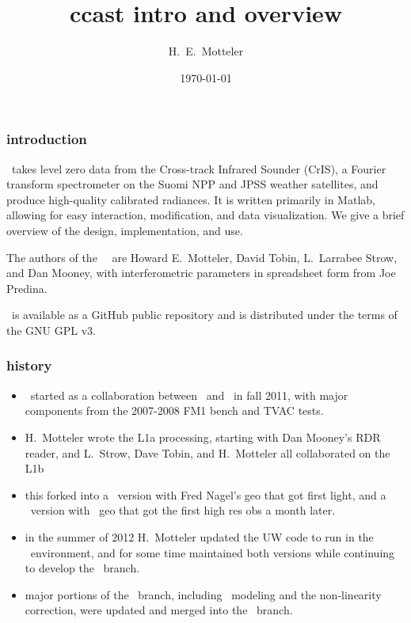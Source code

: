 \documentclass[11pt]{beamer}
\title{ccast intro and overview}
\author{H.~E.~Motteler}
\institute{
  UMBC Atmospheric Spectroscopy Lab \\
  Joint Center for Earth Systems Technology \\
}
\date{\today}
\begin{document}
\begin{frame}[plain]
\titlepage
\end{frame}
\begin{frame}
\frametitle{introduction}

\ccast\ takes level zero data from the Cross-track Infrared Sounder
(CrIS), a Fourier transform spectrometer on the Suomi NPP and JPSS
weather satellites, and produce high-quality calibrated radiances.
It is written primarily in Matlab, allowing for easy interaction,
modification, and data visualization.  We give a brief overview of
the design, implementation, and use.

\hspace{2cm}

The authors of the \umbc\ \ccast\ are Howard E.~Motteler, David Tobin,
L.~Larrabee Strow, and Dan Mooney, with interferometric parameters
in spreadsheet form from Joe Predina.

\hspace{2cm}

\ccast\ is available as a GitHub public repository and is distributed
under the terms of the GNU GPL v3.

\end{frame}
\begin{frame}
\frametitle{history}

\begin{itemize}
  \item \ccast\ started as a collaboration between \umbc\ and
    \uw\ in fall 2011, with major components from the 2007-2008 FM1
    bench and TVAC tests.

  \item H.~Motteler wrote the L1a processing, starting with Dan
    Mooney's RDR reader, and L.~Strow, Dave Tobin, and H.~Motteler
    all collaborated on the L1b 

  \item this forked into a \uw\ version with Fred Nagel's geo that
    got first light, and a \umbc\ version with \noaa\ geo that got
    the first high res obs a month later.

  \item in the summer of 2012 H.~Motteler updated the UW code to 
    run in the \umbc\ environment, and for some time maintained both
    versions while continuing to develop the \umbc\ branch.

  \item major portions of the \uw\ branch, including \ict\ modeling
    and the non-linearity correction, were updated and merged into
    the \umbc\ branch.
\end{itemize}


\end{frame}
\end{document}
